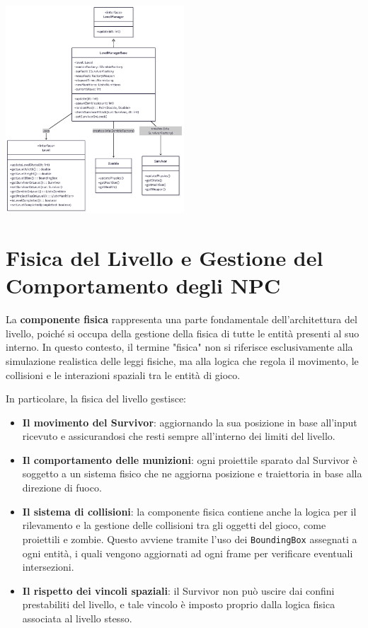 \documentclass[a4paper,12pt]{report}
\begin{document}
\bigskip
\begin{center}
\includegraphics[width=0.5\textwidth]{img/LevelManager.png}
\end{center}
\section{Fisica del Livello e Gestione del Comportamento degli NPC}

La \textbf{componente fisica} rappresenta una parte fondamentale dell'architettura del livello, poiché si occupa della gestione della fisica di tutte le entità presenti al suo interno. In questo contesto, il termine "fisica" non si riferisce esclusivamente alla simulazione realistica delle leggi fisiche, ma alla logica che regola il movimento, le collisioni e le interazioni spaziali tra le entità di gioco.

In particolare, la fisica del livello gestisce:

\begin{itemize}
    \item \textbf{Il movimento del Survivor}: aggiornando la sua posizione in base all'input ricevuto e assicurandosi che resti sempre all'interno dei limiti del livello.
    
    \item \textbf{Il comportamento delle munizioni}: ogni proiettile sparato dal Survivor è soggetto a un sistema fisico che ne aggiorna posizione e traiettoria in base alla direzione di fuoco.
    
    \item \textbf{Il sistema di collisioni}: la componente fisica contiene anche la logica per il rilevamento e la gestione delle collisioni tra gli oggetti del gioco, come proiettili e zombie. Questo avviene tramite l'uso dei \texttt{BoundingBox} assegnati a ogni entità, i quali vengono aggiornati ad ogni frame per verificare eventuali intersezioni.
    
    \item \textbf{Il rispetto dei vincoli spaziali}: il Survivor non può uscire dai confini prestabiliti del livello, e tale vincolo è imposto proprio dalla logica fisica associata al livello stesso.
\end{itemize}
\end{document}
